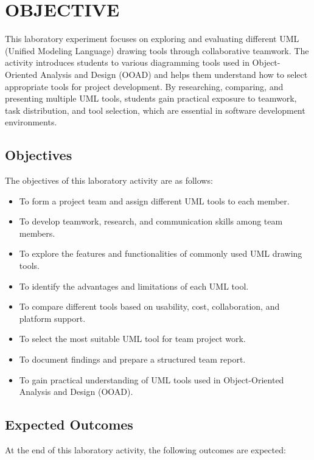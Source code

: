 \chapter{OBJECTIVE}\label{obj}
This laboratory experiment focuses on exploring and evaluating different UML (Unified Modeling Language) drawing tools through collaborative teamwork. The activity introduces students to various diagramming tools used in Object-Oriented Analysis and Design (OOAD) and helps them understand how to select appropriate tools for project development. By researching, comparing, and presenting multiple UML tools, students gain practical exposure to teamwork, task distribution, and tool selection, which are essential in software development environments.

\section{Objectives}

The objectives of this laboratory activity are as follows:

\begin{itemize}
  \item To form a project team and assign different UML tools to each member.
  \item To develop teamwork, research, and communication skills among team members.
  \item To explore the features and functionalities of commonly used UML drawing tools.
  \item To identify the advantages and limitations of each UML tool.
  \item To compare different tools based on usability, cost, collaboration, and platform support.
  \item To select the most suitable UML tool for team project work.
  \item To document findings and prepare a structured team report.
  \item To gain practical understanding of UML tools used in Object-Oriented Analysis and Design (OOAD).
\end{itemize}

\section{Expected Outcomes}

At the end of this laboratory activity, the following outcomes are expected:

